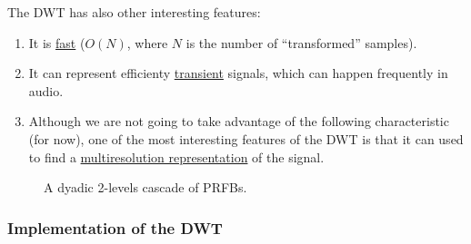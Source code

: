 The DWT has also other interesting features:
\begin{enumerate}
\item It is
  \href{https://en.wikipedia.org/wiki/Discrete_wavelet_transform#Time_complexity}{fast}
  ($O(N)$, where $N$ is the number of ``transformed'' samples).
\item It can represent efficienty
  \href{https://en.wikipedia.org/wiki/Transient_(oscillation)}{transient}
  signals, which can happen frequently in audio.
\item Although we are not going to take advantage of the following
  characteristic (for now), one of the most interesting features of
  the DWT is that it can used to find a
  \href{https://en.wikipedia.org/wiki/Multiresolution_analysis}{multiresolution
    representation} of the signal.
\end{enumerate}

\begin{figure}
  \centering
  \caption{A dyadic 2-levels cascade of PRFBs.}
  \label{fig:cascade}
\end{figure}


\subsubsection{Implementation of the DWT}

